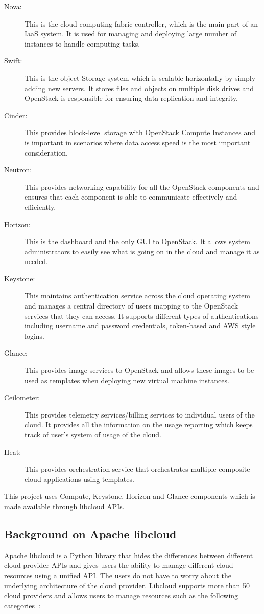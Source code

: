 \begin{description}
   \item[Nova:] This is the cloud computing fabric controller, which is the
   main part of an IaaS system. It is used for managing and deploying large
   number of instances to handle computing tasks. 
   \item[Swift:] This is the object Storage system which is scalable
   horizontally by simply adding new servers. It stores files and objects on
   multiple disk drives and OpenStack is responsible for ensuring data
   replication and integrity. 
   \item[Cinder:] This provides block-level storage with OpenStack Compute
   Instances and is important in scenarios where data access speed is the most
   important consideration. 
   \item[Neutron:] This provides networking capability for all the
   OpenStack components and ensures that each component is able to communicate
   effectively and efficiently. 
   \item[Horizon:] This is the dashboard and the only GUI to OpenStack. It
   allows system administrators to easily see what is going on in the cloud and
   manage it as needed.  
   \item[Keystone:] This maintains authentication service across the cloud
   operating system and manages a central directory of users mapping to the
   OpenStack services that they can access. It supports different types of
   authentications including username and password credentials, token-based and
   AWS style logins.
   \item[Glance:] This provides image services to OpenStack and allows
   these images to be used as templates when deploying new virtual machine
   instances. 
   \item[Ceilometer:] This provides telemetry services/billing services to
   individual users of the cloud. It provides all the information on the usage
   reporting which keeps track of user's system of usage of the cloud.
   \item[Heat:] This provides orchestration service that orchestrates
   multiple composite cloud applications using templates. 
\end{description}
	
This project uses Compute, Keystone, Horizon and Glance components which is 
made available through libcloud APIs. 

\subsection{Background on Apache libcloud}
Apache libcloud is a Python library that hides the differences between 
different cloud provider APIs and gives users the ability to manage different 
cloud resources using a unified API. The users do not have to worry about the
underlying architecture of the cloud provider. Libcloud supports more than 50
cloud providers and allows users to manage resources such as the following
categories~\cite{hid-sp18-516-www-libcloud}:

